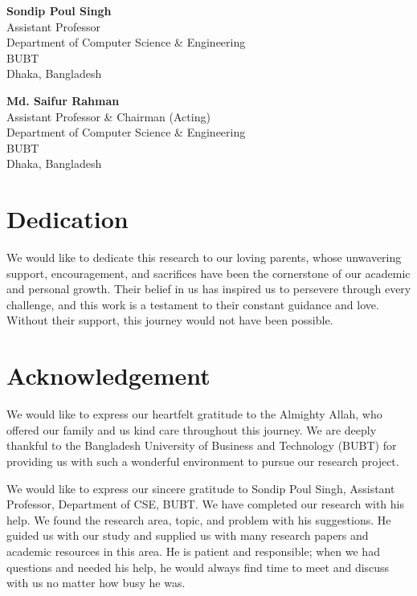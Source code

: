 \documentclass[12pt, a4paper]{report}
\begin{document}
\vspace{2.5cm}
\noindent
\begin{minipage}[t]{0.45\textwidth}
\textbf{Sondip Poul Singh}\\
Assistant Professor\\
Department of Computer Science \& Engineering\\
BUBT\\
Dhaka, Bangladesh
\end{minipage}
\hfill
\begin{minipage}[t]{0.45\textwidth}
\textbf{Md. Saifur Rahman}\\
Assistant Professor \& Chairman (Acting)\\
Department of Computer Science \& Engineering\\
BUBT\\
Dhaka, Bangladesh
\end{minipage}
\clearpage

\chapter*{Dedication}
{}
We would like to dedicate this research to our loving parents, whose unwavering support, encouragement, and sacrifices have been the cornerstone of our academic and personal growth. Their belief in us has inspired us to persevere through every challenge, and this work is a testament to their constant guidance and love. Without their support, this journey would not have been possible.
\clearpage

\chapter*{Acknowledgement}
{}
We would like to express our heartfelt gratitude to the Almighty Allah, who offered our family and us kind care throughout this journey. We are deeply thankful to the Bangladesh University of Business and Technology (BUBT) for providing us with such a wonderful environment to pursue our research project. 

We would like to express our sincere gratitude to Sondip Poul Singh, Assistant Professor, Department of CSE, BUBT. We have completed our research with his help. We found the research area, topic, and problem with his suggestions. He guided us with our study and supplied us with many research papers and academic resources in this area. He is patient and responsible; when we had questions and needed his help, he would always find time to meet and discuss with us no matter how busy he was. 
\end{document}
